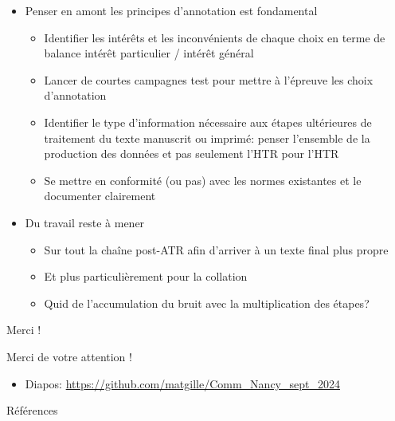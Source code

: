 \documentclass[11pt,aspectratio=169]{beamer}
\begin{document}
\begin{frame}
\begin{itemize}
\item Penser en amont les principes d'annotation est fondamental
\begin{itemize}
\item Identifier les intérêts et les inconvénients de chaque choix en terme de balance intérêt particulier / intérêt général
\item Lancer de courtes campagnes test pour mettre à l'épreuve les choix d'annotation
\item Identifier le type d'information nécessaire aux étapes ultérieures de traitement du texte manuscrit ou imprimé: penser l'ensemble de la production des données et pas seulement l'HTR pour l'HTR
\item Se mettre en conformité (ou pas) avec les normes existantes et le documenter clairement
\end{itemize}
\item Du travail reste à mener
\begin{itemize}
\item Sur tout la chaîne post-ATR afin d'arriver à un texte final plus propre
\item Et plus particulièrement pour la collation
\item Quid de l'accumulation du bruit avec la multiplication des étapes?
\end{itemize}
\end{itemize}
\end{frame}


\begin{frame}{Merci !}
\begin{center}
\color{black}Merci de votre attention !
\begin{itemize}
\item Diapos: \url{https://github.com/matgille/Comm_Nancy_sept_2024}
\end{itemize}
\end{center}
\end{frame}



\begin{frame}[allowframebreaks]{Références}
\printbibliography
\end{frame}
\end{document}
